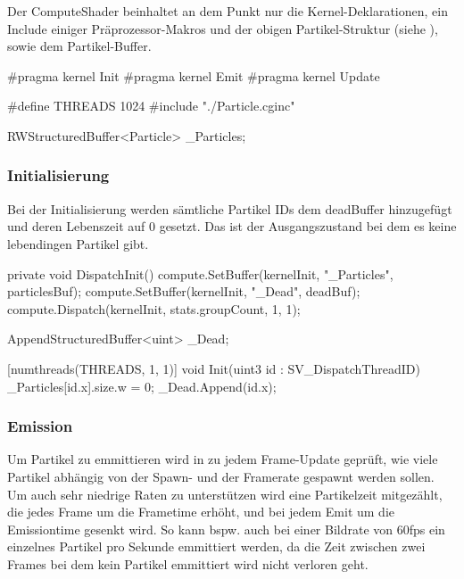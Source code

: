 Der ComputeShader beinhaltet an dem Punkt nur die Kernel-Deklarationen, ein Include einiger Präprozessor-Makros und der obigen Partikel-Struktur (siehe ), sowie dem Partikel-Buffer. %

\begin{hlsl}[caption=Compute Setup]
#pragma kernel Init
#pragma kernel Emit
#pragma kernel Update

#define THREADS 1024
#include "./Particle.cginc"

RWStructuredBuffer<Particle> _Particles;
\end{hlsl}

\subsubsection{Initialisierung}

Bei der Initialisierung werden sämtliche Partikel IDs dem deadBuffer hinzugefügt und deren Lebenszeit auf 0 gesetzt. Das ist der Ausgangszustand bei dem es keine lebendingen Partikel gibt.

\begin{csh}[caption=Controller Init Dispatch]
private void DispatchInit()
{
    compute.SetBuffer(kernelInit, "_Particles", particlesBuf);
    compute.SetBuffer(kernelInit, "_Dead", deadBuf);
    compute.Dispatch(kernelInit, stats.groupCount, 1, 1);
}
\end{csh}

\begin{hlsl}[caption=Compute Init Kernel]
AppendStructuredBuffer<uint> _Dead;

[numthreads(THREADS, 1, 1)]
void Init(uint3 id : SV_DispatchThreadID)
{
    _Particles[id.x].size.w = 0;
    _Dead.Append(id.x);
}
\end{hlsl}



\subsubsection{Emission}

Um Partikel zu emmittieren wird in zu jedem Frame-Update geprüft, wie viele Partikel abhängig von der Spawn- und der Framerate gespawnt werden sollen. Um auch sehr niedrige Raten zu unterstützen wird eine Partikelzeit mitgezählt, die jedes Frame um die Frametime erhöht, und bei jedem Emit um die Emissiontime gesenkt wird. So kann bspw. auch bei einer Bildrate von 60fps ein einzelnes Partikel pro Sekunde emmittiert werden, da die Zeit zwischen zwei Frames bei dem kein Partikel emmittiert wird nicht verloren geht.

